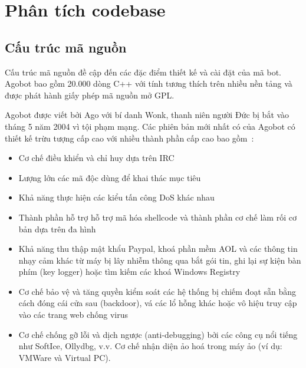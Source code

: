 
\chapter{Phân tích codebase}


\section{Cấu trúc mã nguồn}

Cấu trúc mã nguồn đề cập đến các đặc điểm thiết kế và cài đặt của mã bot.
Agobot bao gồm 20.000 dòng C++ với tính tương thích trên nhiều nền tảng và
được phát hành giấy phép mã nguồn mở GPL.

Agobot được viết bởi Ago với bí danh Wonk, thanh niên người Đức bị
bắt vào tháng 5 năm 2004 vì tội phạm mạng. Các phiên bản mới nhất có của Agobot
có thiết kế trừu tượng cấp cao với nhiều thành phần cấp cao bao gồm~\cite{inside,honeynet53}:

\begin{itemize}
\item Cơ chế điều khiển và chỉ huy dựa trên IRC
\item Lượng lớn các mã độc dùng để khai thác mục tiêu
\item Khả năng thực hiện các kiểu tấn công DoS khác nhau
\item Thành phần hỗ trợ hỗ trợ mã hóa shellcode và thành phần cơ chế làm rối cơ bản dựa trên đa hình
\item Khả năng thu thập mật khẩu Paypal, khoá phần mềm AOL và các thông tin
	nhạy cảm khác từ máy bị lây nhiễm thông qua bắt gói tin, ghi lại sự kiện
	bàn phím (key logger) hoặc tìm kiếm các khoá Windows Registry
\item Cơ chế bảo vệ và tăng quyền kiểm soát các hệ thống bị chiếm đoạt sẵn
	bằng cách đóng cái cửa sau (backdoor), vá các lổ hỗng khác hoặc vô hiệu
	truy cập vào các trang web chống virus
\item Cơ chế chống gỡ lỗi và dịch ngược (anti-debugging) bởi
	các công cụ nổi tiếng như SoftIce, Ollydbg, v.v.
	Cơ chế nhận diện ảo hoá trong máy ảo (ví dụ: VMWare và Virtual PC).
\end{itemize}

